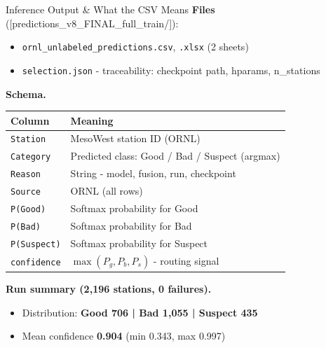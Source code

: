 \documentclass[aspectratio=169]{beamer}
\begin{document}
\begin{frame}{Inference Output \& What the CSV Means}
  \textbf{Files} ([predictions\_v8\_FINAL\_full\_train/]):
  \begin{itemize}
    \item \texttt{ornl\_unlabeled\_predictions.csv}, \texttt{.xlsx} (2 sheets)
    \item \texttt{selection.json} - traceability: checkpoint path, hparams, n\_stations
  \end{itemize}

  \textbf{Schema.}
  \begin{center}\small
  \begin{tabular}{ll}
    \toprule
    Column & Meaning \\
    \midrule
    \texttt{Station}      & MesoWest station ID (ORNL) \\
    \texttt{Category}     & Predicted class: Good / Bad / Suspect (argmax) \\
    \texttt{Reason}       & String - model, fusion, run, checkpoint \\
    \texttt{Source}       & ORNL (all rows) \\
    \texttt{P(Good)}      & Softmax probability for Good \\
    \texttt{P(Bad)}       & Softmax probability for Bad \\
    \texttt{P(Suspect)}   & Softmax probability for Suspect \\
    \texttt{confidence}   & $\max(P_g, P_b, P_s)$ - routing signal \\
    \bottomrule
  \end{tabular}
  \end{center}


\end{frame}


















\begin{frame}

  \textbf{Run summary (2{,}196 stations, 0 failures).}
  \begin{itemize}
    \item Distribution: \textbf{Good 706 \;|\; Bad 1{,}055 \;|\; Suspect 435}
    \item Mean confidence \textbf{0.904} (min 0.343, max 0.997)
  \end{itemize}
\end{frame}
\end{document}
